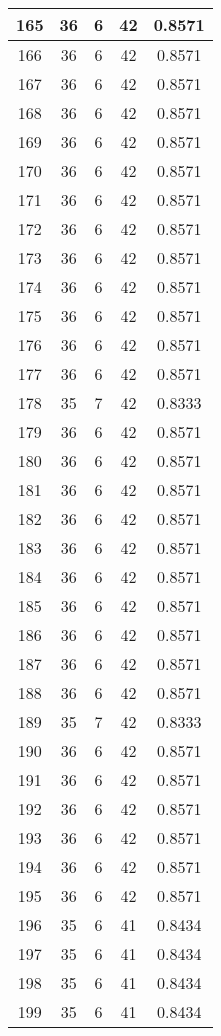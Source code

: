 \documentclass[letterpaper, 12pt]{article}
\begin{document}
\begin{longtable}{|c|c|c|c|c|}
\hline
165 & 36 & 6 & 42 & 0.8571 \\
\hline
166 & 36 & 6 & 42 & 0.8571 \\
\hline
167 & 36 & 6 & 42 & 0.8571 \\
\hline
168 & 36 & 6 & 42 & 0.8571 \\
\hline
169 & 36 & 6 & 42 & 0.8571 \\
\hline
170 & 36 & 6 & 42 & 0.8571 \\
\hline
171 & 36 & 6 & 42 & 0.8571 \\
\hline
172 & 36 & 6 & 42 & 0.8571 \\
\hline
173 & 36 & 6 & 42 & 0.8571 \\
\hline
174 & 36 & 6 & 42 & 0.8571 \\
\hline
175 & 36 & 6 & 42 & 0.8571 \\
\hline
176 & 36 & 6 & 42 & 0.8571 \\
\hline
177 & 36 & 6 & 42 & 0.8571 \\
\hline
178 & 35 & 7 & 42 & 0.8333 \\
\hline
179 & 36 & 6 & 42 & 0.8571 \\
\hline
180 & 36 & 6 & 42 & 0.8571 \\
\hline
181 & 36 & 6 & 42 & 0.8571 \\
\hline
182 & 36 & 6 & 42 & 0.8571 \\
\hline
183 & 36 & 6 & 42 & 0.8571 \\
\hline
184 & 36 & 6 & 42 & 0.8571 \\
\hline
185 & 36 & 6 & 42 & 0.8571 \\
\hline
186 & 36 & 6 & 42 & 0.8571 \\
\hline
187 & 36 & 6 & 42 & 0.8571 \\
\hline
188 & 36 & 6 & 42 & 0.8571 \\
\hline
189 & 35 & 7 & 42 & 0.8333 \\
\hline
190 & 36 & 6 & 42 & 0.8571 \\
\hline
191 & 36 & 6 & 42 & 0.8571 \\
\hline
192 & 36 & 6 & 42 & 0.8571 \\
\hline
193 & 36 & 6 & 42 & 0.8571 \\
\hline
194 & 36 & 6 & 42 & 0.8571 \\
\hline
195 & 36 & 6 & 42 & 0.8571 \\
\hline
196 & 35 & 6 & 41 & 0.8434 \\
\hline
197 & 35 & 6 & 41 & 0.8434 \\
\hline
198 & 35 & 6 & 41 & 0.8434 \\
\hline
199 & 35 & 6 & 41 & 0.8434 \\
\hline
\end{longtable}
\end{document}
